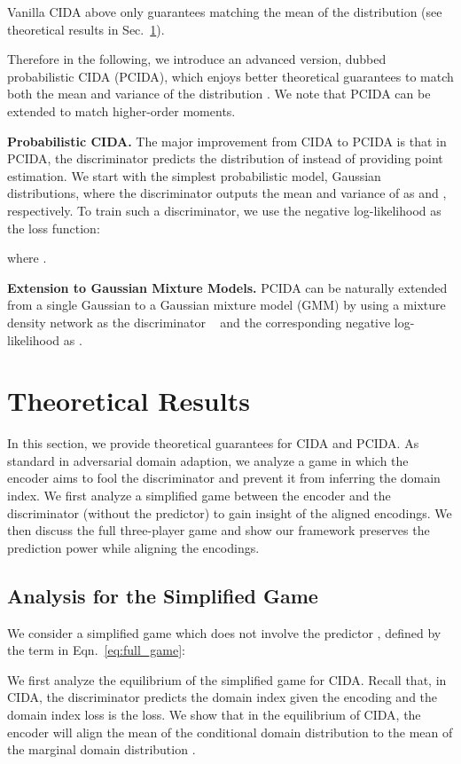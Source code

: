 \documentclass{article}
\newcommand{\secref}[1]{Sec.~\ref{#1}}
\newcommand{\eqnref}[1]{Eqn.~\ref{#1}}
\begin{document}
Vanilla CIDA above only guarantees matching the mean of the distribution  (see theoretical results in \secref{sec:theory}). 

Therefore in the following, we introduce an advanced version, dubbed probabilistic CIDA (PCIDA), which enjoys better theoretical guarantees to match both the mean and variance of the distribution . We note that PCIDA can be extended to match higher-order moments.

\textbf{Probabilistic CIDA.} The major improvement from CIDA to PCIDA is that in PCIDA, the discriminator predicts the distribution of  instead of providing point estimation. We start with the simplest probabilistic model, Gaussian distributions, where the discriminator  outputs the mean and variance of  as  and , respectively. To train such a discriminator, we use the negative log-likelihood as the loss function:

where . 

\textbf{Extension to Gaussian Mixture Models.} PCIDA can be naturally extended from a single Gaussian to a Gaussian mixture model (GMM) by using a mixture density network as the discriminator ~\cite{MDN} and the corresponding negative log-likelihood as .  \section{Theoretical Results}\label{sec:theory}
In this section, we provide theoretical guarantees for CIDA and PCIDA. As standard in adversarial domain adaption, we analyze a game in which the encoder aims to fool the discriminator and prevent it from inferring the domain index.  We first analyze a simplified game between the encoder and the discriminator (without the predictor) to gain insight of the aligned encodings. We then discuss the full three-player game and show our framework preserves the prediction power while aligning the encodings.

\subsection{Analysis for the Simplified Game}
We consider a simplified game which does not involve the predictor , defined by the  term in \eqnref{eq:full_game}:


We first analyze the equilibrium of the simplified game for CIDA.
Recall that, in CIDA, the discriminator  predicts the domain index  given the encoding  and the domain index loss  is the  loss. We show that in the equilibrium of CIDA, the encoder will align the mean of the conditional domain distribution  to the mean of the marginal domain distribution .
\end{document}
